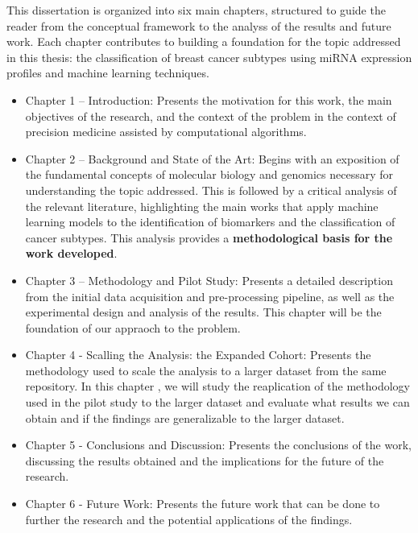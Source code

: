 This dissertation is organized into six main chapters, structured to guide the
reader from the conceptual framework to the analyss of the results and future work. Each
chapter contributes to building a foundation for the topic addressed in this
thesis: the classification of breast cancer subtypes using miRNA expression
profiles and machine learning techniques.
\begin{itemize}
  \item Chapter 1 – Introduction: Presents the motivation for this work, the main
        objectives of the research, and the context of the problem in the context of
        precision medicine assisted by computational algorithms.

  \item Chapter 2 – Background and State of the Art: Begins with an exposition of the
        fundamental concepts of molecular biology and genomics necessary for
        understanding the topic addressed. This is followed by a critical analysis of
        the relevant literature, highlighting the main works that apply machine
        learning models to the identification of biomarkers and the classification of
        cancer subtypes. This analysis provides a \textbf{methodological basis for the
          work developed}.

  \item Chapter 3 – Methodology and Pilot Study: Presents a detailed description 
  from the initial data acquisition and pre-processing pipeline, as well as 
  the experimental design and analysis of the results. This chapter will be the 
  foundation of our appraoch to the problem.

  \item Chapter 4 - Scalling the Analysis: the Expanded Cohort: Presents the methodology used 
  to scale the analysis to a larger dataset from the same repository. In this chapter , we will
  study the reaplication of the methodology used in the pilot study to the larger dataset and evaluate 
  what results we can obtain and if the findings are generalizable to the larger dataset.

  \item Chapter 5 - Conclusions and Discussion: Presents the conclusions of the work, 
  discussing the results obtained and the implications for the future of the research.

  \item Chapter 6 - Future Work: Presents the future work that can be done to further 
  the research and the potential applications of the findings.

\end{itemize}

